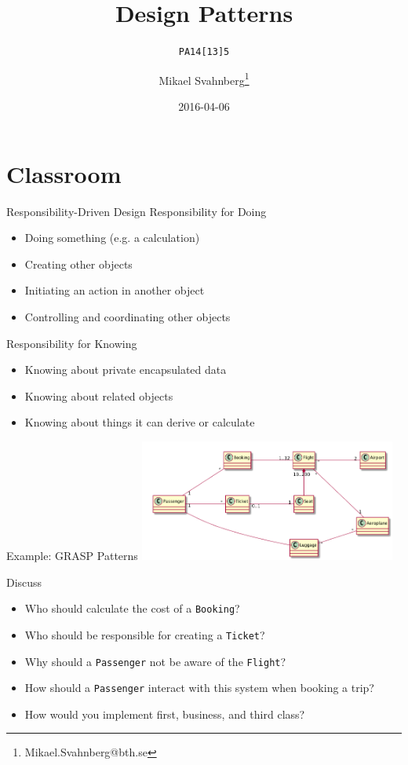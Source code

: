 \documentclass[10pt,t,a4paper]{beamer}
\author{Mikael Svahnberg\thanks{Mikael.Svahnberg@bth.se}}
\date{2016-04-06}
\title{Design Patterns}
\subtitle{\texttt{PA14[13]5}}
\begin{document}
\maketitle

\section{Classroom}
\label{sec:orgheadline10}
\begin{frame}[label={sec:orgheadline1}]{Responsibility-Driven Design}
Responsibility for \alert{Doing}
\begin{itemize}
\item Doing something (e.g. a calculation)
\item Creating other objects
\item Initiating an action in another object
\item Controlling and coordinating other objects
\end{itemize}

Responsibility for \alert{Knowing}
\begin{itemize}
\item Knowing about private encapsulated data
\item Knowing about related objects
\item Knowing about things it can derive or calculate
\end{itemize}
\end{frame}
\begin{frame}[fragile,label={sec:orgheadline2}]{Example: GRASP Patterns}
 \vspace{-1cm}
\includegraphics[height=4cm]{FGRASPExample.png}

\begin{block}{Discuss}
\begin{itemize}
\item Who should calculate the cost of a \texttt{Booking}?
\item Who should be responsible for creating a \texttt{Ticket}?
\item Why should a \texttt{Passenger} not be aware of the \texttt{Flight}?
\item How should a \texttt{Passenger} interact with this system when booking a trip?
\item How would you implement first, business, and third class?
\end{itemize}
\end{block}
\end{frame}
\end{document}
